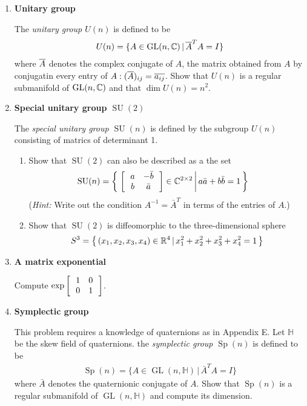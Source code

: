 \documentclass[12pt,a4paper]{report}
\begin{document}
\begin{enumerate}[label=\textbf{15.\arabic*.}]
	\item \textbf{Unitary group}
	
	The \textit{unitary group $U(n)$} is defined to be 
	\begin{align*}
		U(n) = \{A \in \operatorname{GL}(n,\mathbb{C})\,|\, \overline{A}^TA=I \}
	\end{align*}where $\overline{A}$ denotes the complex conjugate of $A$, the matrix obtained from $A$ by conjugatin every entry of $A: (\overline{A})_{ij}=\overline{a_{ij}}$.  Show that $U(n)$ is a regular submanifold of $\operatorname{GL}(n,\mathbb{C})$ and that $\dim U(n)=n^2$.
	
	\item \textbf{Special unitary group $\operatorname{SU}(2)$}
	
	The \textit{special unitary group $\operatorname{SU}(n)$} is defined by the subgroup $U(n)$ consisting of matrics of determinant 1.
	\begin{enumerate}[label=(\alph*)]
		\item Show that $\operatorname{SU}(2)$ can also be described as a the set
		\begin{align*}
			\operatorname{SU}(n) &= \left \{\, \left . \left [\,  \begin{array}{c c} a&-\bar{b} \\ b & \bar{a} \end{array}  \,\right ]\in \mathbb{C}^{2\times 2} \, \right |a\bar{a}+b\bar{b}=1 \,\right \}
		\end{align*}(\textit{Hint:} Write out the condition $A^{-1}=\bar{A}^T$ in terms of the entries of $A$.)
		
		\item Show that $\operatorname{SU}(2)$ is diffeomorphic to the three-dimensional sphere
		\begin{align*}
			S^3=\left \{\, (x_1,x_2,x_3,x_4)\in \mathbb{R}^4 \,|\, x_1^2+x_2^2+x_3^2+x_4^2=1 \,\right \}
		\end{align*}
	\end{enumerate}
	
	\item \textbf{A matrix exponential}
	
	Compute $\operatorname{exp}\left [\,  \begin{array}{c c} 1&0 \\ 0 & 1 \end{array}  \,\right ]$.
	
	\item \textbf{Symplectic group}
	
	\newcommand{\HH}{\mathbb{H}}
	This problem requires a knowledge of quaternions as in Appendix E.  Let $\HH$ be the skew field of quaternions. the \textit{symplectic group $\operatorname{Sp}(n)$} is defined to be 
	\begin{align*}
		\operatorname{Sp}(n) = \{A \in \operatorname{GL}(n,\HH)\,|\,\bar{A}^TA=I\}
	\end{align*}where $\bar{A}$ denotes the quaternionic conjugate of $A$.  Show that $\operatorname{Sp}(n)$ is a regular submanifold of $\operatorname{GL}(n,\HH)$ and compute its dimension.
	

\end{enumerate}
\end{document}
